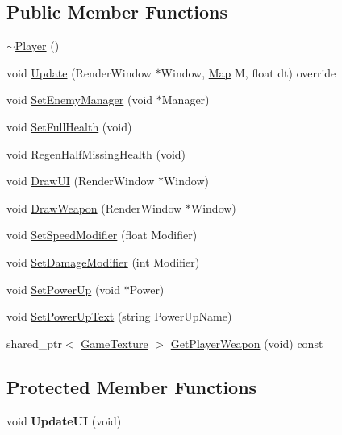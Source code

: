 \subsection*{Public Member Functions}
\begin{DoxyCompactItemize}
\item 
\hyperlink{class_engine_1_1_game_play_1_1_player_a39c82fa94afe71949a7fff50fed2a4d0}{$\sim$\+Player} ()
\item 
void \hyperlink{class_engine_1_1_game_play_1_1_player_a06c682bf13c20fb2390807ec681b0121}{Update} (Render\+Window $\ast$Window, \hyperlink{class_engine_1_1_core_1_1_map}{Map} M, float dt) override
\item 
void \hyperlink{class_engine_1_1_game_play_1_1_player_adedc5552f70e5495ca1391b6f6143bec}{Set\+Enemy\+Manager} (void $\ast$Manager)
\item 
void \hyperlink{class_engine_1_1_game_play_1_1_player_a426ebc69b0607902e73563655ad66693}{Set\+Full\+Health} (void)
\item 
void \hyperlink{class_engine_1_1_game_play_1_1_player_aad2c7f9e75ef259e202be0d00924ec1d}{Regen\+Half\+Missing\+Health} (void)
\item 
void \hyperlink{class_engine_1_1_game_play_1_1_player_a4b3e08479cfc81c66eadf1e9da4a47fe}{Draw\+UI} (Render\+Window $\ast$Window)
\item 
void \hyperlink{class_engine_1_1_game_play_1_1_player_a3705c78e4c21631432c4c21a0a4e4084}{Draw\+Weapon} (Render\+Window $\ast$Window)
\item 
void \hyperlink{class_engine_1_1_game_play_1_1_player_a5a67ed64c644e9ebea338feb0db0ac98}{Set\+Speed\+Modifier} (float Modifier)
\item 
void \hyperlink{class_engine_1_1_game_play_1_1_player_a04dccb49dde0606ba440b07944abdc65}{Set\+Damage\+Modifier} (int Modifier)
\item 
void \hyperlink{class_engine_1_1_game_play_1_1_player_aa592871c49210d80e1cda615e0dee15d}{Set\+Power\+Up} (void $\ast$Power)
\item 
void \hyperlink{class_engine_1_1_game_play_1_1_player_a97680b34067c1b28ee3d43ab994f10ef}{Set\+Power\+Up\+Text} (string Power\+Up\+Name)
\item 
shared\+\_\+ptr$<$ \hyperlink{class_engine_1_1_core_1_1_game_texture}{Game\+Texture} $>$ \hyperlink{class_engine_1_1_game_play_1_1_player_a22261e9c06350f20de748418085dd26a}{Get\+Player\+Weapon} (void) const
\end{DoxyCompactItemize}
\subsection*{Protected Member Functions}
\begin{DoxyCompactItemize}
\item 
\mbox{\label{class_engine_1_1_game_play_1_1_player_a1ed8e67b1e585015f13614277470a188}} 
void {\bfseries Update\+UI} (void)
\end{DoxyCompactItemize}
